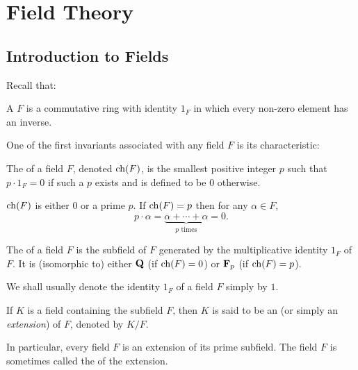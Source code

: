 \chapter{Field Theory}\label{chap:field-theory}
\section{Introduction to Fields}
Recall that:
\begin{definition}[Field]
A  $F$ is a commutative ring with identity $1_F$ in which every non-zero element has an inverse.
\end{definition}


One of the first invariants associated with any field $F$ is its characteristic:

\begin{definition}[Characteristic]
The  of a field $F$, denoted $\operatorname{ch}(F)$, is the smallest positive integer $p$ such that $p\cdot 1_F=0$ if such a $p$ exists and is defined to be $0$ otherwise.
\end{definition}

\begin{proposition}
$\operatorname{ch}(F)$ is either $0$ or a prime $p$. If $\operatorname{ch}(F)=p$ then for any $\alpha\in F$,
\[p\cdot\alpha=\underbrace{\alpha+\cdots+\alpha}_\text{$p$ times}=0.\]
\end{proposition}

\begin{definition}
The  of a field $F$ is the subfield of $F$ generated by the multiplicative identity $1_F$ of $F$. It is (isomorphic to) either $\mathbf Q$ (if $\operatorname{ch}(F)=0$) or $\mathbf F_p$ (if $\operatorname{ch}(F)=p$).
\end{definition}

\begin{notation}
We shall usually denote the identity $1_F$ of a field $F$ simply by $1$.
\end{notation}

\begin{definition}
If $K$ is a field containing the subfield $F$, then $K$ is said to be an  (or simply an \emph{extension}) of $F$, denoted by $K/F$.
\end{definition}

In particular, every field $F$ is an extension of its prime subfield. The field $F$ is sometimes called the  of the extension.

